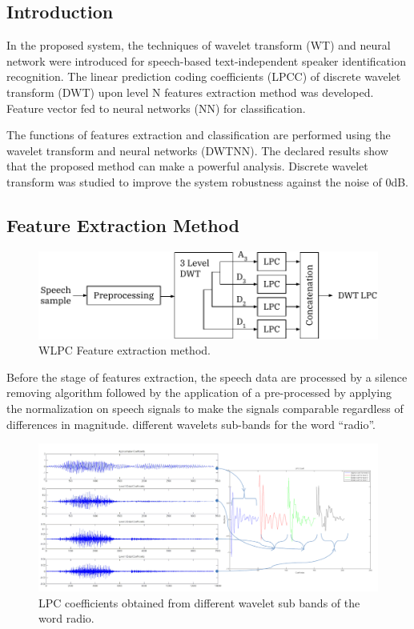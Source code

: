 \documentclass[12pt, a4paper, twoside]{report}
\begin{document}
\subsection{Introduction}
In the proposed system, the techniques of wavelet transform (WT) and neural network were introduced for speech-based text-independent speaker identification recognition. The linear prediction coding coefficients (LPCC) of discrete wavelet transform (DWT) upon level N features extraction method was developed. Feature vector fed to neural networks (NN) for classification.
\par
The functions of features extraction and classification are performed using the wavelet transform and neural networks (DWTNN). The declared results show that the proposed method can make a powerful analysis. Discrete wavelet transform was studied to improve the system robustness against the noise of 0dB. 
\subsection{Feature Extraction Method}
\begin{figure}[!h]
	\centering
	\includegraphics[]
	{images/chapter5/dwt-features}
	\caption{WLPC Feature extraction method.}
	\label{fig:dwt-features}
\end{figure}

Before the stage of features extraction, the speech data are processed by a silence removing algorithm followed by the application of a pre-processed by applying the normalization on speech signals to make the signals comparable regardless of differences in magnitude.
different wavelets sub-bands for the word “radio”.
\begin{figure}[!h]
	\centering
	\includegraphics[width=1\textwidth]
	{images/chapter5/dwt-radio}
	\caption{LPC coefficients obtained from different wavelet sub bands of the word radio.}
	\label{fig:dwt-radio}
\end{figure}
\end{document}
